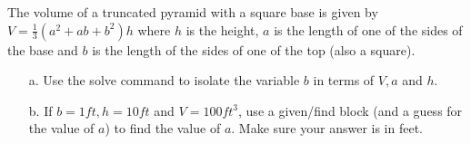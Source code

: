 {The volume of a truncated pyramid with a square base is given by $V=\frac{1}{3} (a^2 + ab +b^2)h$ where $h$ is the height, $a$ is the length of one of the sides of the base and $b$ is the length of the sides of one of the top (also a square).  
\begin{enumerate}
\item[a.] Use the solve command to isolate the variable $b$ in terms of $V,a$ and $h$.
\item[b.] If $b=1 ft, h=10 ft$ and $V=100ft^3$, use a given/find block (and a guess for the value of $a$) to find the value of $a$.  Make sure your answer is in feet.
\end{enumerate}
}
{}
